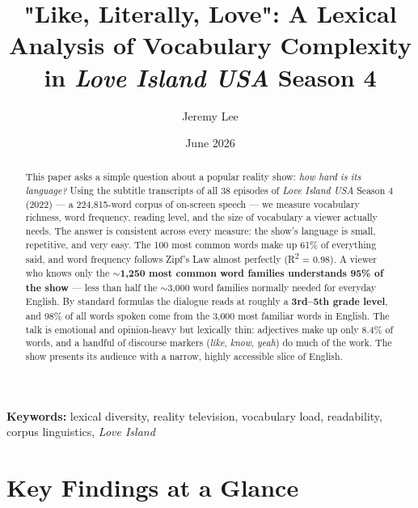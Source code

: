 \documentclass[11pt]{article}
\title{"Like, Literally, Love": A Lexical Analysis of Vocabulary Complexity in \emph{Love Island USA} Season 4}
\author{Jeremy Lee}
\date{June 2026}
\begin{document}
\maketitle
\begin{abstract}

This paper asks a simple question about a popular reality show: \emph{how hard is its language?} Using the subtitle transcripts of all 38 episodes of \emph{Love Island USA} Season 4 (2022) --- a 224,815-word corpus of on-screen speech --- we measure vocabulary richness, word frequency, reading level, and the size of vocabulary a viewer actually needs. The answer is consistent across every measure: the show's language is small, repetitive, and very easy. The 100 most common words make up 61\% of everything said, and word frequency follows Zipf's Law almost perfectly (R\textsuperscript{2} = 0.98). A viewer who knows only the \textbf{$\sim$1,250 most common word families understands 95\% of the show} --- less than half the $\sim$3,000 word families normally needed for everyday English. By standard formulas the dialogue reads at roughly a \textbf{3rd--5th grade level}, and 98\% of all words spoken come from the 3,000 most familiar words in English. The talk is emotional and opinion-heavy but lexically thin: adjectives make up only 8.4\% of words, and a handful of discourse markers (\emph{like}, \emph{know}, \emph{yeah}) do much of the work. The show presents its audience with a narrow, highly accessible slice of English.

\end{abstract}
\smallskip\noindent\textbf{Keywords:} lexical diversity, reality television, vocabulary load, readability, corpus linguistics, \emph{Love Island}


\section*{Key Findings at a Glance}
\end{document}
